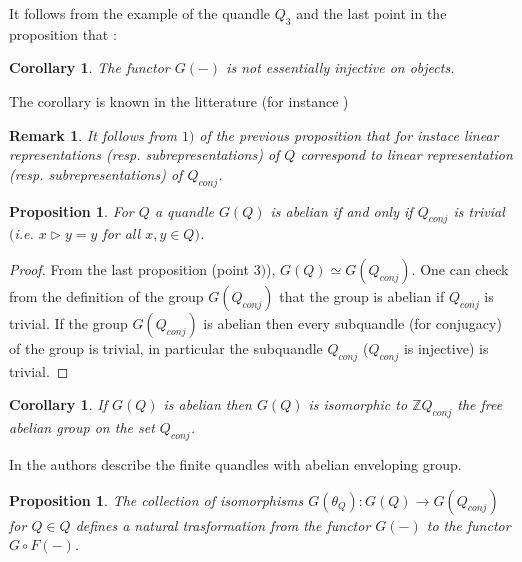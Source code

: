 \documentclass[12pt, reqno]{amsart}
\newtheorem{proposition}[theorem]{Proposition}
\newtheorem{corollary}[theorem]{Corollary}
\newtheorem{remark}[theorem]{Remark}
\newcommand{\Z}{ {\mathbb Z} }
\begin{document}
It follows from the example of the quandle $Q_3$ and the last point in the proposition that :
\begin{corollary}
The functor $G(-)$ is not essentially injective on objects. 
\end{corollary}
The corollary is known in the litterature (for instance \cite{DJ})
\begin{remark}
It follows from $1)$ of the previous proposition that for instace linear representations (resp. subrepresentations) of $Q$ correspond to linear representation (resp. subrepresentations) of $Q_{conj}$. 
\end{remark}
\begin{proposition}
For $Q$ a quandle $G(Q)$ is abelian if and only if $Q_{conj}$ is trivial $($i.e. $x\triangleright y= y$ for all $x,y\in Q$$)$.
\end{proposition}
\begin{proof}
From the last proposition (point $3)$), $G(Q)\simeq G(Q_{conj})$. One can check from the definition of the group $G(Q_{conj})$ that the group is abelian if $Q_{conj}$ is trivial. If the group $G(Q_{conj})$ is abelian then every subquandle (for conjugacy) of the group is trivial, in particular the subquandle $Q_{conj}$ ($Q_{conj}$ is injective) is trivial.
\end{proof}
\begin{corollary}\label{ab1}
If $G(Q)$ is abelian then $G(Q)$ is isomorphic to $\Z Q_{conj}$ the free abelian group on the set $Q_{conj}$.
\end{corollary}
In \cite{ab} the authors describe the finite quandles with abelian enveloping group.
\begin{proposition}
The collection of isomorphisms $G(\theta_Q):G(Q) \to G(Q_{conj})$ for $Q\in Q$ defines a natural trasformation from the functor $G(-)$ to the functor $G\circ F(-)$. 
\end{proposition}
\end{document}
